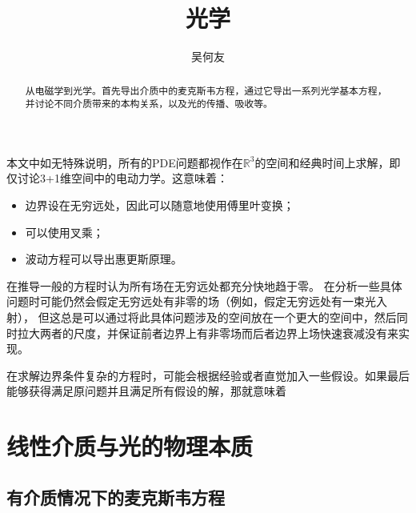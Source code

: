 \documentclass[UTF8, a4paper]{ctexart}
\title{光学}
\author{吴何友}
\newcommand*{\reals}{\mathbb{R}}
\begin{document}
\maketitle

\begin{abstract}
    从电磁学到光学。首先导出介质中的麦克斯韦方程，通过它导出一系列光学基本方程，并讨论不同介质带来的本构关系，以及光的传播、吸收等。
\end{abstract}
\vspace{2em}

本文中如无特殊说明，所有的PDE问题都视作在$\reals^3$的空间和经典时间上求解，即仅讨论3+1维空间中的电动力学。这意味着：
\begin{itemize}
    \item 边界设在无穷远处，因此可以随意地使用傅里叶变换；
    \item 可以使用叉乘；
    \item 波动方程可以导出惠更斯原理。
\end{itemize}

在推导一般的方程时认为所有场在无穷远处都充分快地趋于零。
在分析一些具体问题时可能仍然会假定无穷远处有非零的场（例如，假定无穷远处有一束光入射），
但这总是可以通过将此具体问题涉及的空间放在一个更大的空间中，然后同时拉大两者的尺度，并保证前者边界上有非零场而后者边界上场快速衰减没有来实现。

在求解边界条件复杂的方程时，可能会根据经验或者直觉加入一些假设。如果最后能够获得满足原问题并且满足所有假设的解，那就意味着

\section{线性介质与光的物理本质}

\subsection{有介质情况下的麦克斯韦方程}
\end{document}
